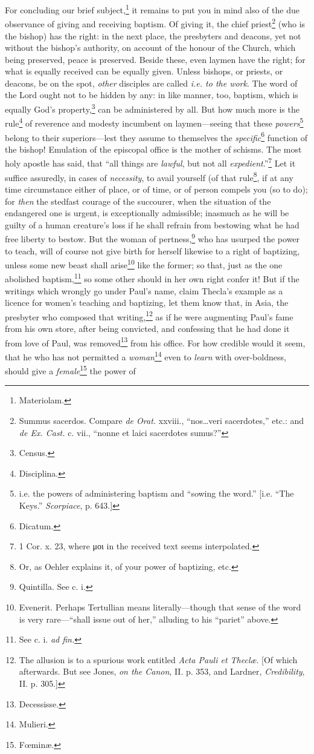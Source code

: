 For concluding our brief subject,\footnote{Materiolam.} it remains to put you in mind also of the due observance of giving and receiving baptism. Of giving it, the chief priest\footnote{Summus sacerdos. Compare \emph{de Orat.} xxviii., “nos…veri sacerdotes,” etc.: and \emph{de Ex. Cast.} c. vii., “nonne et laici sacerdotes sumus?”} (who is the bishop) has the right: in the next place, the presbyters and deacons, yet not without the bishop’s authority, on account of the honour of the Church, which being preserved, peace is preserved. Beside these, even laymen have the right; for what is equally received can be equally given. Unless bishops, or priests, or deacons, be on the spot, \emph{other} disciples are called \emph{i.e. to the work}. The word of the Lord ought not to be hidden by any: in like manner, too, baptism, which is equally God’s property,\footnote{Census.} can be administered by all. But how much more is the rule\footnote{Disciplina.} of reverence and modesty incumbent on laymen—seeing that these \emph{powers}\footnote{i.e. the powers of administering baptism and “sowing the word.” [i.e. “The Keys.” \emph{Scorpiace}, p. 643.]} belong to their superiors—lest they assume to themselves the \emph{specific}\footnote{Dicatum.} function of the bishop! Emulation of the episcopal office is the mother of schisms. The most holy apostle has said, that “all things are \emph{lawful}, but not all \emph{expedient}.”\footnote{1 Cor. x. 23, where \textgreek{μοι} in the received text seems interpolated.} Let it suffice assuredly, in cases of \emph{necessity}, to avail yourself (of that rule\footnote{Or, as Oehler explains it, of your power of baptizing, etc.}, if at any time circumstance either of place, or of time, or of person compels you (so to do); for \emph{then} the stedfast courage of the succourer, when the situation of the endangered one is urgent, is exceptionally admissible; inasmuch as he will be guilty of a human creature’s loss if he shall refrain from bestowing what he had free liberty to bestow. But the woman of pertness,\footnote{Quintilla. See c. i.} who has usurped the power to teach, will of course not give birth for herself likewise to a right of baptizing, unless some new beast shall arise\footnote{Evenerit. Perhaps Tertullian means literally—though that sense of the word is very rare—“shall issue out of her,” alluding to his “pariet” above.} like the former; so that, just as the one abolished baptism,\footnote{See c. i. \emph{ad fin.}} so some other should in her own right confer it! But if the writings which wrongly go under Paul’s name, claim Thecla’s example as a licence for women’s teaching and baptizing, let them know that, in Asia, the presbyter who composed that writing,\footnote{The allusion is to a spurious work entitled \emph{Acta Pauli et Theclæ}. [Of which afterwards. But see Jones, \emph{on the Canon}, II. p. 353, and Lardner, \emph{Credibility}, II. p. 305.]} as if he were augmenting Paul’s fame from his own store, after being convicted, and confessing that he had done it from love of Paul, was removed\footnote{Decessisse.} from his office. For how credible would it seem, that he who has not permitted a \emph{woman}\footnote{Mulieri.} even to \emph{learn} with over-boldness, should give a \emph{female}\footnote{Fœminæ.} the power of 